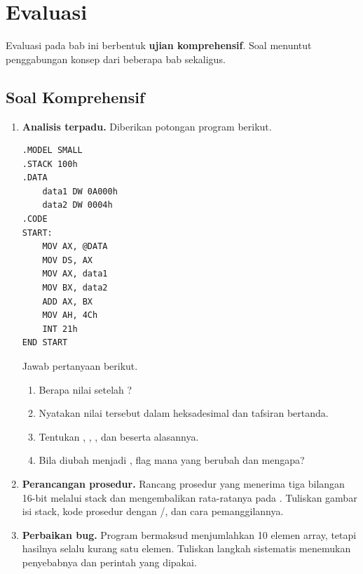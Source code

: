 \section{Evaluasi}
\label{sec:evaluasi-bab17}

Evaluasi pada bab ini berbentuk \textbf{ujian komprehensif}. Soal
menuntut penggabungan konsep dari beberapa bab sekaligus.

\subsection{Soal Komprehensif}

\begin{enumerate}
    \item \textbf{Analisis terpadu.} Diberikan potongan program
          berikut.

\begin{lstlisting}[language=MASM, numbers=none]
.MODEL SMALL
.STACK 100h
.DATA
    data1 DW 0A000h
    data2 DW 0004h
.CODE
START:
    MOV AX, @DATA
    MOV DS, AX
    MOV AX, data1
    MOV BX, data2
    ADD AX, BX
    MOV AH, 4Ch
    INT 21h
END START
\end{lstlisting}

          Jawab pertanyaan berikut.
          \begin{enumerate}
              \item Berapa nilai  setelah ?
              \item Nyatakan nilai tersebut dalam heksadesimal dan
                    tafsiran bertanda.
              \item Tentukan , , , dan
                     beserta alasannya.
              \item Bila  diubah menjadi ,
                    flag mana yang berubah dan mengapa?
          \end{enumerate}

    \item \textbf{Perancangan prosedur.} Rancang prosedur
           yang menerima tiga bilangan 16-bit melalui
          stack dan mengembalikan rata-ratanya pada .
          Tuliskan gambar isi stack, kode prosedur dengan
          /, dan cara pemanggilannya.

    \item \textbf{Perbaikan bug.} Program bermaksud menjumlahkan 10
          elemen array, tetapi hasilnya selalu kurang satu elemen.
          Tuliskan langkah sistematis menemukan penyebabnya dan
          perintah  yang dipakai.


\end{enumerate}
